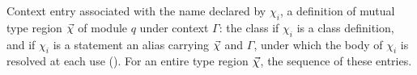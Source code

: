 Context entry associated with the name declared by $\chi_i$, a definition of mutual type region $\seq{\chi}$ of module
$q$ under context $\Gamma$: the class if $\chi_i$ is a class definition, and if $\chi_i$ is a  statement an
alias carrying $\seq{\chi}$ and $\Gamma$, under which the body of $\chi_i$ is resolved at each use ().
For an entire type region $\seq{\chi}$, the sequence of these entries.

